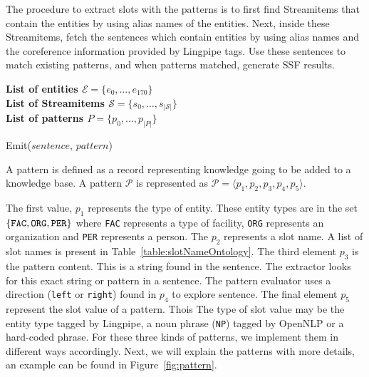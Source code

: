 The procedure to extract slots with the patterns is to 
first find Streamitems that contain the
entities by using alias names of the entities. Next, inside these Streamitems, 
fetch the sentences which contain entities by using alias names and the 
coreference information provided by Lingpipe tags. Use these sentences to 
match existing patterns, and when patterns matched, generate SSF results.

\begin{algorithm}
  \textbf{List of entities $\mathcal{E} = \{e_0, \ldots, e_{170}\}$}\\
  \textbf{List of Streamitems $\mathcal{S} = \{s_0, \ldots, s_{|\mathcal{S}|}\}$}\\
  \textbf{List of patterns $P = \{p_0, \ldots, p_{|P|}\}$}\\
  \begin{algorithmic}%
            \STATE Emit($sentence$, $pattern$)
          \ENDIF
        \ENDFOR
      \ENDFOR
    \ENDFOR
  \end{algorithmic}
\end{algorithm}


A pattern is defined as a record representing knowledge going to be added to a knowledge base.
A pattern $\mathcal{P}$ is represented as $\mathcal{P} = \langle p_1, p_2, p_3, p_4, p_5 \rangle$.

The first value, $p_1$ represents the type of entity. These entity types are in
the set $\{ \text{\tt FAC}, \text{\tt ORG}, \text{\tt PER} \}$ where \texttt{FAC}
represents a type of facility, \texttt{ORG} represents an organization and \texttt{PER}
represents a person.
The $p_2$ represents a slot name.
A list of slot names is present in Table~\ref{table:slotNameOntology}.
The third element $p_3$ is the pattern content. This is a string found in the sentence.
The extractor looks for this exact string or pattern in a sentence.
The pattern evaluator uses a direction (\texttt{left} or \texttt{right}) found in
$p_4$ to explore sentence.
The final element $p_5$ represent the slot value of a pattern. Thois
The type of slot value may be the entity 
type tagged by Lingpipe, a noun phrase (\texttt{NP}) tagged by OpenNLP or a hard-coded phrase. 
For these three kinds of patterns, we implement them in different 
ways accordingly. Next, we will explain the patterns with more details, an
example can be found in Figure~\ref{fig:pattern}. 

